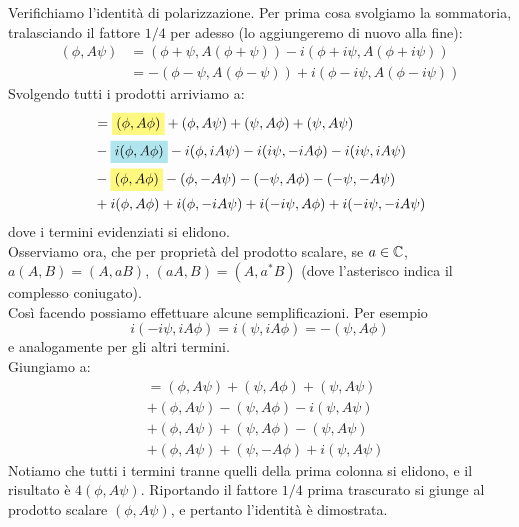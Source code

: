 \documentclass[FisicaTeorica.tex]{subfiles}
\begin{document}
	\begin{expl}
	Verifichiamo l'identità di polarizzazione. Per prima cosa svolgiamo la sommatoria, tralasciando il fattore $1/4$ per adesso (lo aggiungeremo di nuovo alla fine):
	\begin{align*}
	    (\phi, A\psi) &= (\phi+\psi, A(\phi +\psi))-i(\phi+i\psi, A(\phi+i\psi))\\
	    &= -(\phi-\psi, A(\phi-\psi)) +i(\phi-i\psi,A(\phi-i\psi))
	\end{align*}
	Svolgendo tutti i prodotti arriviamo a:
	\begin{align*}
	    &= \hlc{Yellow}{(\phi,A\phi)} + (\phi,A\psi) + (\psi,A\phi) + (\psi,A\psi)\\
	    &- \hlc{SkyBlue}{i(\phi,A\phi)} -i(\phi, iA\psi) -i(i\psi, -iA\phi) -i(i\psi, iA\psi)\\
	    &- \hlc{Yellow}{(\phi,A\phi)}  -(\phi, -A\psi) -(-\psi, A\phi) -(-\psi, -A\psi)\\
	    &+ i(\phi, A\phi) + i(\phi, -iA\psi) +i(-i\psi, A\phi) + i(-i\psi, -iA\psi)
	\end{align*}
	dove i termini evidenziati si elidono.\\
	Osserviamo ora, che per proprietà del prodotto scalare, se $a\in \mathbb{C}$, $a(A,B) = (A,aB)$, $(aA,B) = (A, a^* B)$ (dove l'asterisco indica il complesso coniugato).\\
	Così facendo possiamo effettuare alcune semplificazioni. Per esempio
	\[ i(-i\psi, iA\phi) = i(\psi,iA\phi) = -(\psi,A\phi) \]
	e analogamente per gli altri termini.\\
	Giungiamo a:
	\begin{align*}
	    &= (\phi,A\psi)+(\psi, A\phi)+(\psi, A\psi)\\
	    &+ (\phi, A\psi) -(\psi,A\phi) -i(\psi,A\psi)\\
	    &+ (\phi, A\psi) +(\psi,A\phi) -(\psi, A\psi)\\
	    &+ (\phi, A\psi) + (\psi, -A\phi) +i(\psi,A\psi)
	\end{align*}
	Notiamo che tutti i termini tranne quelli della prima colonna si elidono, e il risultato è $4(\phi, A\psi)$. Riportando il fattore $1/4$ prima trascurato si giunge al prodotto scalare $(\phi, A\psi)$, e pertanto l'identità è dimostrata.
	\end{expl}
\end{document}

